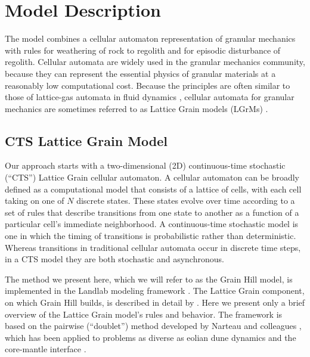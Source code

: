 \documentclass[esurf, manuscript]{copernicus}
\begin{document}
\section{Model Description}

The model combines a cellular automaton representation of granular mechanics with rules for weathering of rock to regolith and for episodic disturbance of regolith. Cellular automata are widely used in the granular mechanics community, because they can represent the essential physics of granular materials at a reasonably low computational cost. Because the principles are often similar to those of lattice-gas automata in fluid dynamics \citep[e.g.,][]{chen1998lattice}, cellular automata for granular mechanics are sometimes referred to as Lattice Grain models (LGrMs)  \citep{gutt1990automata,peng1994density,alonso1996shape,karolyi1998filling,karolyi1999granular,karolyi1998lattice,martinez1998lattice,deserable2002versatile,cottenceau2010open,deserable2011cellular}.

\subsection{CTS Lattice Grain Model}

Our approach starts with a two-dimensional (2D) continuous-time stochastic (``CTS'') Lattice Grain cellular automaton. A cellular automaton can be broadly defined as a computational model that consists of a lattice of cells, with each cell taking on one of $N$ discrete states. These states evolve over time according to a set of rules that describe transitions from one state to another as a function of a particular cell's immediate neighborhood. A continuous-time stochastic model is one in which the timing of transitions is probabilistic rather than deterministic. Whereas transitions in traditional cellular automata occur in discrete time steps, in a CTS model they are both stochastic and asynchronous.

The method we present here, which we will refer to as the Grain Hill model, is implemented in the Landlab modeling framework \citep{hobley2017creative}. The Lattice Grain component, on which Grain Hill builds, is described in detail by \citet{tucker2016celllab}. Here we present only a brief overview of the Lattice Grain model's rules and behavior. The framework is based on the pairwise (``doublet'') method developed by Narteau and colleagues \citep{rozier2014real}, which has been applied to problems as diverse as eolian dune dynamics \citep{narteau2009setting,zhang2010morphodynamics,zhang2012morphology} and the core-mantle interface \citep{narteau2001small}.
\end{document}
